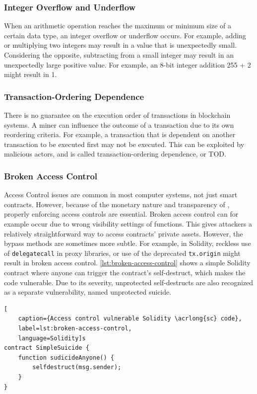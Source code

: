 \subsubsection{Integer Overflow and Underflow}
When an arithmetic operation reaches the maximum or minimum size of a certain data type, an integer overflow or underflow occurs. For example, adding or multiplying two integers may result in a value that is unexpectedly small. Considering the opposite, subtracting from a small integer may result in an unexpectedly large positive value. For example, an 8-bit integer addition 255 + 2 might result in 1.

\subsubsection{Transaction-Ordering Dependence}
There is no guarantee on the execution order of transactions in blockchain systems. A miner can influence the outcome of a transaction due to its own reordering criteria. For example, a transaction that is dependent on another transaction to be executed first may not be executed. This can be exploited by malicious actors, and is called transaction-ordering dependence, or TOD.

\subsubsection{Broken Access Control}
Access Control issues are common in most computer systems, not just smart contracts. However, because of the monetary nature and transparency of , properly enforcing access controls are essential. Broken access control can for example occur due to wrong visibility settings of functions. This gives attackers a relatively straightforward way to access contracts' private assets. However, the bypass methods are sometimes more subtle. For example, in Solidity, reckless use of \lstinline[language=Solidity]!delegatecall! in proxy libraries, or use of the deprecated \lstinline[language=Solidity]!tx.origin! might result in broken access control. \cref{lst:broken-access-control} shows a simple Solidity contract where anyone can trigger the contract's self-destruct, which makes the code vulnerable. Due to its severity, unprotected self-destructs are also recognized as a separate vulnerability, named unprotected suicide.

\begin{lstlisting}[
    caption={Access control vulnerable Solidity \acrlong{sc} code},
    label=lst:broken-access-control,
    language=Solidity]s
contract SimpleSuicide {
    function sudicideAnyone() {
        selfdestruct(msg.sender);
    }
}
\end{lstlisting}

